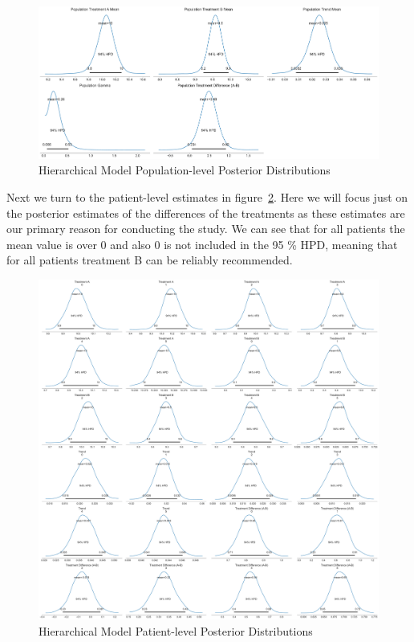 \documentclass[12pt,a4paper,leqno]{report}
\theoremstyle{plain}
\theoremstyle{definition}
\theoremstyle{remark}
\begin{document}

\bigskip
\begin{figure}[H]
    \caption{Hierarchical Model Population-level Posterior Distributions}\label{hierarchicalmodelpopulationposteriors}
    \bigskip
    \includegraphics[width=\textwidth,height=\textheight,keepaspectratio]{hierarchical_model_population_level_posteriors.pdf}
\end{figure}
\bigskip


Next we turn to the patient-level estimates in figure\
\ref{hierarchicalmodelpatientposteriors}. Here we will focus just on the
posterior estimates of the differences of the treatments as these estimates are our
primary reason for conducting the study. We can see that for all patients
the mean value is over 0 and also 0 is not included in the 95 \% HPD, meaning that for
all patients treatment B can be reliably recommended.

\bigskip
\begin{figure}[H]
    \caption{Hierarchical Model Patient-level Posterior Distributions}\label{hierarchicalmodelpatientposteriors}
    \bigskip
    \includegraphics[width=\textwidth,height=\textheight,keepaspectratio]{hierarchical_model_patient_level_posteriors.pdf}
\end{figure}
\bigskip
\end{document}
